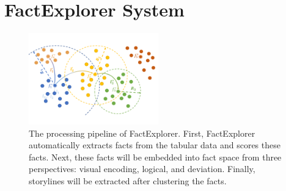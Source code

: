 \maketitle


\section{FactExplorer System} 


\begin{figure}[ht]
	\centering
	\includegraphics[width=0.5\textwidth]{figures/storyline.pdf}
	\caption{The processing pipeline of FactExplorer. First, FactExplorer automatically extracts facts from the tabular data and scores these facts. Next, these facts will be embedded into fact space from three perspectives: visual encoding, logical, and deviation. Finally, storylines will be extracted after clustering the facts.}
	\label{storyline}
\end{figure}